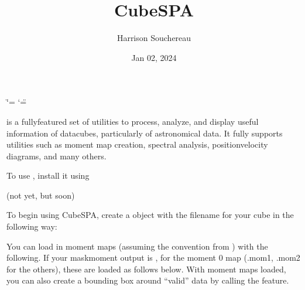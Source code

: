 \documentclass[letterpaper,10pt,english]{sphinxmanual}
\title{CubeSPA}
\date{Jan 02, 2024}
\author{Harrison Souchereau}
\begin{document}
\ifdefined\shorthandoff
  \ifnum\catcode`\=\string=\active\shorthandoff{=}\fi
  \ifnum\catcode`\"=\active{}\fi
\fi

\pagestyle{empty}
\sphinxmaketitle
\pagestyle{plain}
\sphinxtableofcontents
\pagestyle{normal}
\label{\detokenize{index::doc}}


\sphinxAtStartPar
{} is a fully\sphinxhyphen{}featured set of utilities to process, analyze, and display useful information of datacubes, particularly
of astronomical data. It fully supports utilities such as moment map creation, spectral analysis, position\sphinxhyphen{}velocity diagrams, and
many others.

\sphinxAtStartPar
To use , install it using

\sphinxAtStartPar
{} (not yet, but soon)

\sphinxAtStartPar
To begin using CubeSPA, create a  object with the filename for your cube in the following way:

\begin{sphinxVerbatim}[commandchars=\\\{\}]
  
  
\end{sphinxVerbatim}

\sphinxAtStartPar
You can load in moment maps (assuming the convention from   ) with the following. If your maskmoment output is
, for the moment 0 map (.mom1, .mom2 for the others), these are loaded as follows below. With
moment maps loaded, you can also create a bounding box around “valid” data by calling the  feature.

\begin{sphinxVerbatim}[commandchars=\\\{\}]
  
  
    
\end{sphinxVerbatim}
\end{document}
